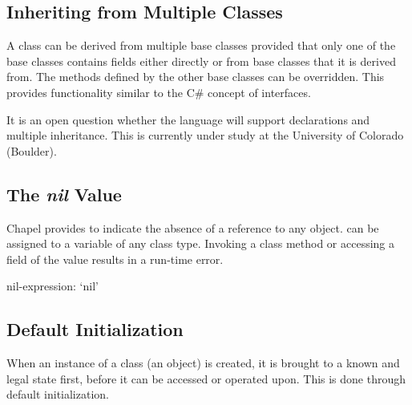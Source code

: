 \subsection{Inheriting from Multiple Classes}
\label{Inheriting_from_Multiple_Classes}

A class can be derived from multiple base classes provided that only
one of the base classes contains fields either directly or from base
classes that it is derived from.  The methods defined by the other
base classes can be overridden.  This provides functionality similar to the C\#
concept of interfaces.

\begin{openissue}
It is an open question whether the language will support 
declarations and multiple inheritance. This is currently under study
at the University of Colorado (Boulder).
\end{openissue}

\subsection{The {\em nil} Value}
\label{Class_nil_value}

Chapel provides  to indicate the absence of a reference to
any object.   can be assigned to a variable of any class
type.  Invoking a class method or accessing a field of the 
value results in a run-time error.

\begin{syntax}
nil-expression:
  `nil'
\end{syntax}

\subsection{Default Initialization}
\label{Default_Initialization}

When an instance of a class (an object) is created, it is brought to a
known and legal state first, before it can be accessed or operated upon.
This is done through default initialization.

